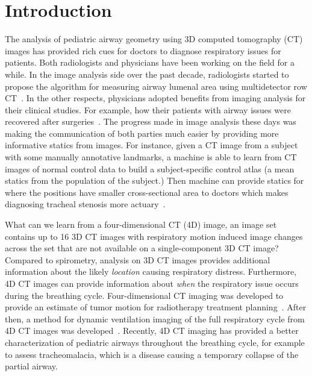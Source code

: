 \section{Introduction}
\label{sec:intro}

The analysis of pediatric airway geometry using 3D computed tomography (CT) images has provided rich cues for doctors to diagnose respiratory issues for patients.
Both radiologists and physicians have been working on the field for a while.
In the image analysis side over the past decade, radiologists started to propose the algorithm for measuring airway lumenal area using multidetector row CT~\cite{nakano2002development}.
In the other respects, physicians adopted benefits from imaging analysis for their clinical studies. 
For example, how their patients with airway issues were recovered after surgeries~\cite{abramson2011three}.
The progress made in image analysis these days was making the communication of both parties much easier by providing more informative statics from images.
For instance, given a CT image from a subject with some manually annotative landmarks, a machine is able to learn from CT images of normal control data to build a subject-specific control atlas (a mean statics from the population of the subject.) 
Then machine can provide statics for where the positions have smaller cross-sectional area to doctors which makes diagnosing tracheal stenosis more actuary~\cite{hong2014statistical}.

What can we learn from a four-dimensional CT (4D) image, an image set contains up to 16 3D CT images with respiratory motion induced image changes across the set that are not available on a single-component 3D CT image?
Compared to spirometry, analysis on 3D CT images provides additional information about the likely {\it location} causing respiratory distress.
Furthermore, 4D CT images can provide information about {\it when} the respiratory issue occurs during the breathing cycle.
Four-dimensional CT imaging was developed to provide an estimate of tumor motion for radiotherapy treatment planning~\cite{ford2003respiration}.
After then, a method for dynamic ventilation imaging of the full respiratory cycle from 4D CT images was developed~\cite{guerrero2006dynamic}.
Recently, 4D CT imaging has provided a better characterization of pediatric airways throughout the breathing cycle, for example to assess tracheomalacia, which is a disease causing a temporary collapse of the partial airway.

